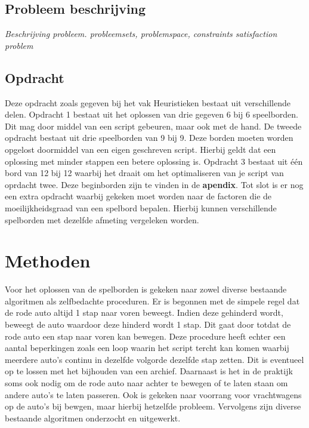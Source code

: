 \documentclass[a4paper]{article}
\begin{document}
\subsection{Probleem beschrijving}
\textit{Beschrijving probleem. probleemsets, problemspace, constraints satisfaction problem}

\subsection{Opdracht}
Deze opdracht zoals gegeven bij het vak Heuristieken bestaat uit verschillende delen. Opdracht 1 bestaat uit het oplossen van drie gegeven 6 bij 6 speelborden. Dit mag door middel van een script gebeuren, maar ook met de hand. De tweede opdracht bestaat uit drie speelborden van 9 bij 9. Deze borden moeten worden opgelost doormiddel van een eigen geschreven script. Hierbij geldt dat een oplossing met minder stappen een betere oplossing is. Opdracht 3 bestaat uit één bord van 12 bij 12 waarbij het draait om het optimaliseren van je script van oprdacht twee. Deze beginborden zijn te vinden in de \textbf{apendix}. Tot slot is er nog een extra opdracht waarbij gekeken moet worden naar de factoren die de moeilijkheidsgraad van een spelbord bepalen. Hierbij kunnen verschillende spelborden met dezelfde afmeting vergeleken worden.

\section{Methoden}
Voor het oplossen van de spelborden is gekeken naar zowel diverse bestaande algoritmen als zelfbedachte proceduren. Er is begonnen met de simpele regel dat de rode auto altijd 1 stap naar voren beweegt. Indien deze gehinderd wordt, beweegt de auto waardoor deze hinderd wordt 1 stap. Dit gaat door totdat de rode auto een stap naar voren kan bewegen. Deze procedure heeft echter een aantal beperkingen zoals een loop waarin het script tercht kan komen waarbij meerdere auto's continu in dezelfde volgorde dezelfde stap zetten. Dit is eventueel op te lossen met het bijhouden van een archief. Daarnaast is het in de praktijk soms ook nodig om de rode auto naar achter te bewegen of te laten staan om andere auto's te laten passeren. Ook is gekeken naar voorrang voor vrachtwagens op de auto's bij bewgen, maar hierbij hetzelfde probleem. Vervolgens zijn diverse bestaande algoritmen onderzocht en uitgewerkt.
\end{document}
